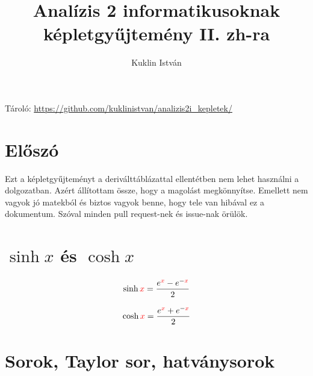 \documentclass[a4paper,12pt]{article}
\begin{document}
\renewcommand{\arraystretch}{1.2}


\newcommand{\n}{\ensuremath{\textcolor{blue}{n}}}
\renewcommand{\k}{\ensuremath{\textcolor{PineGreen}{k}}}
\newcommand{\x}{\ensuremath{\textcolor{red}{x}}}
\renewcommand{\u}{\ensuremath{\textcolor{darkgreen}{u}}}
\renewcommand{\c}{\ensuremath{\textcolor{Sepia}{c}}}
\newcommand{\q}{\ensuremath{\textcolor{SkyBlue}{q}}}

\newcommand{\sumi}{\ensuremath{\sum_{\n= 0}^{\infty}}}

\title{Analízis 2 informatikusoknak képletgyűjtemény II. zh-ra}
\author{Kuklin István}

\maketitle

\noindent Tároló: \url{https://github.com/kuklinistvan/analizis2i_kepletek/}

\tableofcontents

\newpage
\boldmath

\section{Előszó}
Ezt a képletgyűjteményt a deriválttáblázattal ellentétben nem lehet használni a dolgozatban. Azért állítottam össze, hogy a magolást megkönnyítse. Emellett nem vagyok jó matekból és biztos vagyok benne, hogy tele van hibával ez a dokumentum. Szóval minden pull request-nek és issue-nak örülök.

\section{$\sinh x$ és $\cosh x$}
\begin{minipage}{0.5\textwidth}
\begin{equation}
\sinh \x = \frac{e^{\x} - e^{-\x}}{2}
\end{equation}
\end{minipage}
\begin{minipage}{0.5\textwidth}
\begin{equation}
\cosh \x = \frac{e^{\x} + e^{-\x}}{2}
\end{equation}
\end{minipage}

\section{Sorok, Taylor sor, hatványsorok}
\end{document}
